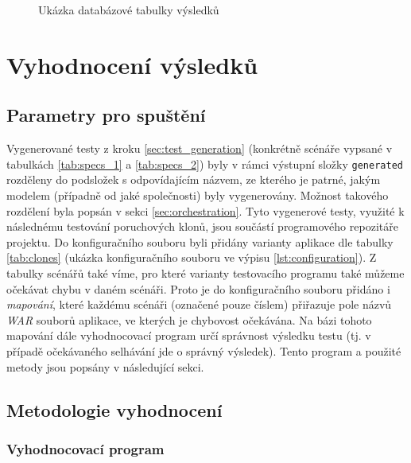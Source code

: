 \documentclass[czech, ma, kiv, he, iso690alph, pdf, viewonly]{fasthesis}
\begin{document}
    \begin{figure}
        \centering
        \caption{Ukázka databázové tabulky výsledků}
        \label{fig:sqlite_report}
    \end{figure}


\chapter{Vyhodnocení výsledků}

    \section{Parametry pro spuštění} \label{sec:run_parameters}

    Vygenerované testy z kroku \ref{sec:test_generation} (konkrétně scénáře vypsané v tabulkách \ref{tab:specs_1} a \ref{tab:specs_2}) byly v rámci výstupní složky \verb|generated| rozděleny do podsložek s odpovídajícím názvem, ze kterého je patrné, jakým modelem (případně od jaké společnosti) byly vygenerovány. Možnost takového rozdělení byla popsán v sekci \ref{sec:orchestration}. Tyto vygenerové testy, využité k následnému testování poruchových klonů, jsou součástí programového repozitáře projektu. Do konfiguračního souboru byli přidány varianty aplikace dle tabulky \ref{tab:clones} (ukázka konfiguračního souboru ve výpisu \ref{lst:configuration}). Z tabulky scénářů také víme, pro které varianty testovacího programu také můžeme očekávat chybu v daném scénáři. Proto je do konfiguračního souboru přidáno i \textit{mapování}, které každému scénáři (označené pouze číslem) přiřazuje pole názvů \textit{WAR} souborů aplikace, ve kterých je chybovost očekávána. Na bázi tohoto mapování dále vyhodnocovací program určí správnost výsledku testu (tj. v případě očekávaného selhávání jde o správný výsledek). Tento program a použité metody jsou popsány v následující sekci.

    
    \section{Metodologie vyhodnocení}
        
        \subsection{Vyhodnocovací program} \label{sec:evaluation}
\end{document}
